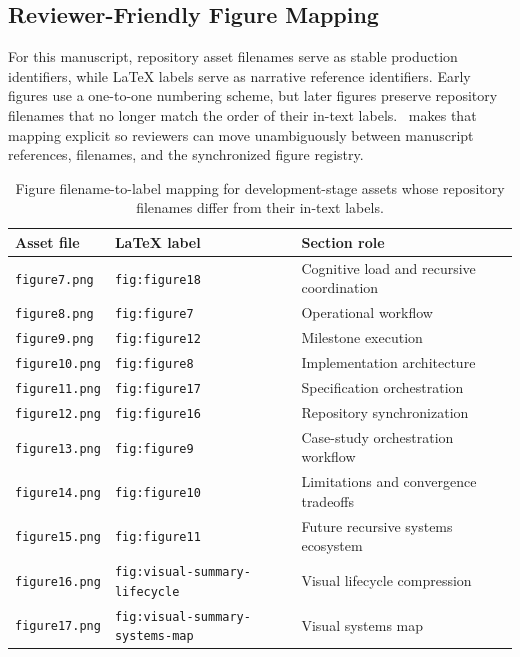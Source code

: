 \subsection{Reviewer-Friendly Figure Mapping}

For this manuscript, repository asset filenames serve as stable production identifiers, while \LaTeX{} labels serve as narrative reference identifiers. Early figures use a one-to-one numbering scheme, but later figures preserve repository filenames that no longer match the order of their in-text labels.~ makes that mapping explicit so reviewers can move unambiguously between manuscript references, filenames, and the synchronized figure registry.

\begin{table}[H]
  \centering
  \small
  \caption{Figure filename-to-label mapping for development-stage assets whose repository filenames differ from their in-text labels.}
  \label{tab:figure-mapping}
  \begin{tabularx}{\linewidth}{l l X}
    \toprule
    \textbf{Asset file} & \textbf{LaTeX label} & \textbf{Section role} \\
    \midrule
    \texttt{figure7.png} & \texttt{fig:figure18} & Cognitive load and recursive coordination \\
    \texttt{figure8.png} & \texttt{fig:figure7} & Operational workflow \\
    \texttt{figure9.png} & \texttt{fig:figure12} & Milestone execution \\
    \texttt{figure10.png} & \texttt{fig:figure8} & Implementation architecture \\
    \texttt{figure11.png} & \texttt{fig:figure17} & Specification orchestration \\
    \texttt{figure12.png} & \texttt{fig:figure16} & Repository synchronization \\
    \texttt{figure13.png} & \texttt{fig:figure9} & Case-study orchestration workflow \\
    \texttt{figure14.png} & \texttt{fig:figure10} & Limitations and convergence tradeoffs \\
    \texttt{figure15.png} & \texttt{fig:figure11} & Future recursive systems ecosystem \\
    \texttt{figure16.png} & \texttt{fig:visual-summary-lifecycle} & Visual lifecycle compression \\
    \texttt{figure17.png} & \texttt{fig:visual-summary-systems-map} & Visual systems map \\
    \bottomrule
  \end{tabularx}
\end{table}

